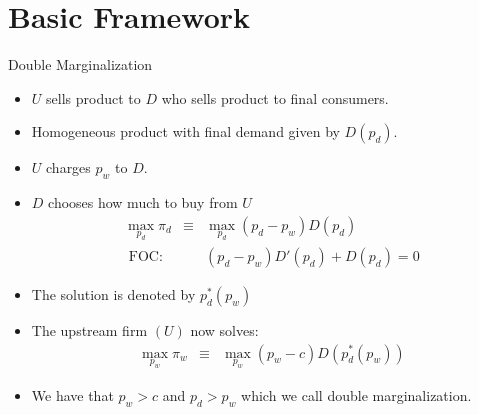 \documentclass[aspectratio=169,11pt]{beamer}
\begin{document}
\section{Basic Framework}
\begin{frame}{Double Marginalization}
\small
\begin{itemize}
\item $U$ sells product to $D$ who sells product to final consumers.
\item Homogeneous product with final demand given by $D(p_d)$.
\item $U$ charges $p_w$ to $D$.
\item $D$ chooses how much to buy from $U$
\begin{eqnarray*}
\max_{p_d} \pi_d &\equiv& \max_{p_d} (p_d-p_w) D(p_d) \\
\mbox{ FOC: }&&  (p_d - p_w) D'(p_d) + D(p_d) = 0
\end{eqnarray*}
\item The solution is denoted by $p_d^*(p_w)$
\item The upstream firm $(U)$ now solves:
\begin{eqnarray*}
\max_{p_w} \pi_w &\equiv& \max_{p_w} (p_w-c ) D(p_d^*(p_w)) 
\end{eqnarray*}
\item We have that $p_w  > c$ and $p_d > p_w$ which we call \alert{double marginalization}.
\end{itemize}
\end{frame}
\end{document}
